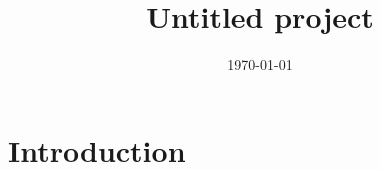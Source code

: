 \documentclass{article}
\title{Untitled project}
\author{}
\date{\today}
\begin{document}
\maketitle

\section{Introduction}
\end{document}
